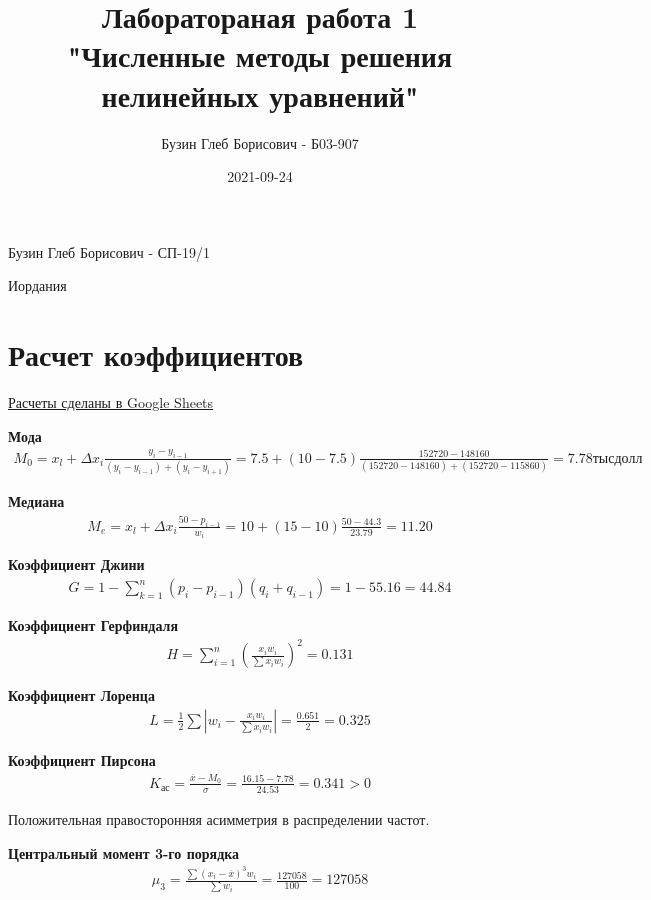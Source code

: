 \documentclass[a4paper,11pt]{article}
\title{
    Лаборатораная работа 1 \\
    "Численные методы решения нелинейных уравнений"
}
\date{2021-09-24}
\author{Бузин Глеб Борисович - Б03-907}
\begin{document}
\begin{flushright}
    Бузин Глеб Борисович - СП-19/1
\end{flushright}

\begin{center}
    \huge{Иордания}
\end{center}

\section{Расчет коэффициентов}

\href{https://docs.google.com/spreadsheets/d/1DhepzMyJwSX1xKBgFEJX6ws6Pb4RSUK4NXO9V3fjGvQ/edit?usp=sharing}{Расчеты сделаны в Google Sheets}

\bigskip

\indent
\textbf{Мода}
\begin{align*}
M_0 = x_l + \varDelta x_i \frac{y_i - y_{i-1}}{(y_i - y_{i-1}) + (y_i - y_{i+1})} = 7.5 + (10 - 7.5) \frac{152720 - 148160}{(152720 - 148160) + (152720 - 115860)} = 7.78 тыс долл
\end{align*}

\textbf{Медиана}
\begin{align*}
M_e = x_l + \varDelta x_i \frac{50 - p_{i-1}}{w_i} = 10 + (15 - 10) \frac{50 - 44.3}{23.79} = 11.20
\end{align*}

\textbf{Коэффициент Джини}
\begin{align*}
G = 1 - \sum_{k=1}^n (p_i - p_{i-1})(q_i + q_{i-1}) = 1 - 55.16 = 44.84
\end{align*}

\textbf{Коэффициент Герфиндаля}
\begin{align*}
H = \sum_{i=1}^n \left(\frac{x_i w_i}{\sum x_i w_i}\right)^2 = 0.131
\end{align*}

\textbf{Коэффициент Лоренца}
\begin{align*}
L = \frac{1}{2} \sum |w_i - \frac{x_i w_i}{\sum x_i w_i}| = \frac{0.651}{2} = 0.325
\end{align*}

\textbf{Коэффициент Пирсона}
\begin{align*}
K_{ас} = \frac{\overline{x} - M_0}{\sigma} = \frac{16.15 - 7.78}{24.53} = 0.341 > 0
\end{align*}

Положительная правосторонняя
асимметрия в распределении частот.

\textbf{Центральный момент 3-го порядка}
\begin{align*}
\mu_3 = \frac{\sum (x_i - \overline{x})^3 w_i}{\sum w_i} = \frac{127058}{100} = 127058
\end{align*}
\end{document}
